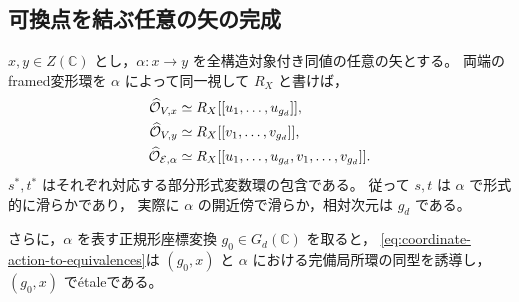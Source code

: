 \subsection{可換点を結ぶ任意の矢の完成}

\begin{theorem}
\label{thm:equivalence-source-formal-smooth}
$x,y\in Z(\mathbb C)$ とし，$\alpha:x\to y$ を全構造対象付き同値の任意の矢とする。
両端のframed変形環を $\alpha$ によって同一視して $R_X$ と書けば，
\begin{align}
 \widehat{\mathcal O}_{V,x}
    &\simeq R_X[[u_1,\ldots,u_{g_d}]],\notag\\
 \widehat{\mathcal O}_{V,y}
    &\simeq R_X[[v_1,\ldots,v_{g_d}]],\notag\\
 \widehat{\mathcal O}_{\mathcal E,\alpha}
    &\simeq R_X[[u_1,\ldots,u_{g_d},v_1,\ldots,v_{g_d}]].
 \label{eq:equivalence-completed-local-ring}
\end{align}
$s^*,t^*$ はそれぞれ対応する部分形式変数環の包含である。
従って $s,t$ は $\alpha$ で形式的に滑らかであり，
実際に $\alpha$ の開近傍で滑らか，相対次元は $g_d$ である。

さらに，$\alpha$ を表す正規形座標変換 $g_0\in G_d(\mathbb C)$ を取ると，
\eqref{eq:coordinate-action-to-equivalences}は
$(g_0,x)$ と $\alpha$ における完備局所環の同型を誘導し，
$(g_0,x)$ で\'{e}taleである。
\end{theorem}
